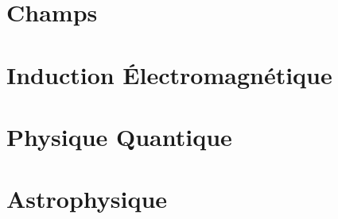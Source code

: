 \documentclass[french, a4paper, 12pt]{article}
\begin{document}
\section{Champs}
\pagebreak

\section{Induction Électromagnétique}
\pagebreak

\section{Physique Quantique}
\pagebreak

\section{Astrophysique}
\end{document}
